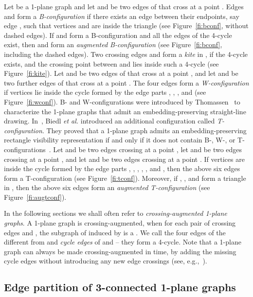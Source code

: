 \documentclass{article}
\begin{document}
Let  be a 1-plane graph and let  and  be two edges of  that cross at a point .  Edges  and  form a {\em B-configuration} if there exists an edge between their endpoints, say edge , such that vertices  and  are inside the triangle  (see  Figure~\ref{fi:bconf}, without dashed edges). If  and  form a B-configuration and all the edges of the 4-cycle  exist, then  and  form an \emph{augmented B-configuration} (see Figure~\ref{fi:bconf}, including the dashed edges). Two crossing edges  and  form a \emph{kite} in , if the 4-cycle  exists, and the crossing point  between  and  lies inside such a 4-cycle (see Figure~\ref{fi:kite}). Let  and  be two edges of  that cross at a point , and let  and  be two further edges of  that cross at a point . The four edges form a \emph{W-configuration} if vertices  lie inside the cycle formed by the edge parts , , , and  (see Figure~\ref{fi:wconf}). B- and W-configurations were introduced by Thomassen~\cite{t-rdg-JGT88} to characterize the 1-plane graphs that admit an embedding-preserving straight-line drawing. In~\cite{SoCG}, Biedl {\em et al.} introduced an additional configuration called \emph{T-configuration}. They proved that a 1-plane graph admits an embedding-preserving rectangle visibility representation if and only if it does not contain B-, W-, or T-configurations~\cite{SoCG}. Let  and  be two edges crossing at a point , let   and  be two edges crossing at a point , and let  and  be two edges crossing at a point . If vertices  are inside the cycle formed by the edge parts , , , , , and , then the above six edges form a T-configuration (see Figure~\ref{fi:tconf}). Moreover, if , ,  and  form a triangle in , then the above six edges form an \emph{augmented T-configuration} (see Figure~\ref{fi:augtconf}).

In the following sections we shall often refer to \emph{crossing-augmented 1-plane graphs}. A 1-plane graph  is crossing-augmented, when for each pair of crossing edges  and , the subgraph of  induced by  is a . We call  the four edges of the  different from  and  \emph{cycle edges} of  and   -- they form a 4-cycle. Note that a 1-plane graph can always be made crossing-augmented in  time, by adding the missing cycle edges without introducing any new edge crossings (see, e.g.,~\cite{DBLP:conf/gd/AlamBK13,Suzuki2010}). 


\subsection{Edge partition of 3-connected 1-plane graphs}\label{sse:partition}
\end{document}

